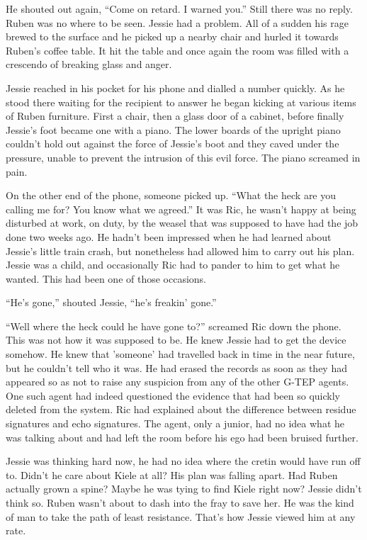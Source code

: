 He shouted out again, ``Come on retard.  I warned you.''  Still there was no reply.  Ruben was no where to be seen.  Jessie had a problem.  All of a sudden his rage brewed to the surface and he picked up a nearby chair and hurled it towards Ruben's coffee table.  It hit the table and once again the room was filled with a crescendo of breaking glass and anger.  

Jessie reached in his pocket for his phone and dialled a number quickly.  As he stood there waiting for the recipient to answer he began kicking at various items of Ruben furniture.  First a chair, then a glass door of a cabinet, before finally Jessie's foot became one with a piano.  The lower boards of the upright piano couldn't hold out against the force of Jessie's boot and they caved under the pressure, unable to prevent the intrusion of this evil force.  The piano screamed in pain.  

On the other end of the phone, someone picked up.  ``What the heck are you calling me for?  You know what we agreed.''  It was Ric, he wasn't happy at being disturbed at work, on duty, by the weasel that was supposed to have had the job done two weeks ago.  He hadn't been impressed when he had learned about Jessie's little train crash, but nonetheless had allowed him to carry out his plan.  Jessie was a child, and occasionally Ric had to pander to him to get what he wanted.  This had been one of those occasions.

``He's gone,'' shouted Jessie, ``he's freakin' gone.''

``Well where the heck could he have gone to?'' screamed Ric down the phone.  This was not how it was supposed to be.  He knew Jessie had to get the device somehow.  He knew that 'someone' had travelled back in time in the near future, but he couldn't tell who it was.  He had erased the records as soon as they had appeared so as not to raise any suspicion from any of the other G-TEP agents.  One such agent had indeed questioned the evidence that had been so quickly deleted from the system.  Ric had explained about the difference between residue signatures and echo signatures.  The agent, only a junior, had no idea what he was talking about and had left the room before his ego had been bruised further.

Jessie was thinking hard now, he had no idea where the cretin would have run off to.  Didn't he care about Kiele at all?  His plan was falling apart.  Had Ruben actually grown a spine?  Maybe he was tying to find Kiele right now?  Jessie didn't think so.  Ruben wasn't about to dash into the fray to save her.  He was the kind of man to take the path of least resistance.  That's how Jessie viewed him at any rate.  

